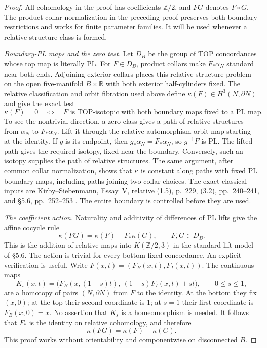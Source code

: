 \begin{proof}
All cohomology in the proof has coefficients $\mathbb Z/2$, and
$FG$ denotes $F\circ G$.  The product-collar normalization in the
preceding proof preserves both boundary restrictions and works for
finite parameter families.  It will be used whenever a relative
structure class is formed.

\emph{Boundary-PL maps and the zero test.}
Let $D_B$ be the group of TOP concordances whose top map is
literally PL.  For $F\in D_B$, product collars make $F_*\alpha_N$
standard near both ends.  Adjoining exterior collars places this
relative structure problem on the open five-manifold $B\times\mathbb R$
with both exterior half-cylinders fixed.  The relative classification
and orbit fibration used above define $\kappa(F)\in H^3(N,\partial N)$
and give the exact test
\begin{equation}\label{eq:relative-zero-test-boundary-pl}
 \kappa(F)=0
 \quad\Longleftrightarrow\quad
 F\text{ is TOP-isotopic with both boundary maps fixed to a PL map}.
\end{equation}
To see the nontrivial direction, a zero class gives a path of relative
structures from $\alpha_N$ to $F_*\alpha_N$.  Lift it through the
relative automorphism orbit map starting at the identity.  If $g$
is its endpoint, then $g_*\alpha_N=F_*\alpha_N$, so $g^{-1}F$ is
PL.  The lifted path gives the required isotopy, fixed near the
boundary.  Conversely, such an isotopy supplies the path of relative
structures.  The same argument, after common collar normalization,
shows that $\kappa$ is constant along paths with fixed PL boundary
maps, including paths joining two collar choices.  The exact
classical inputs are Kirby--Siebenmann, Essay~V, relative (1.5),
p.~229, (3.2), pp.~240--241, and \S5.6, pp.~252--253
\cite{KirbySiebenmann1977}.  The entire boundary is controlled before
they are used.

\emph{The coefficient action.}
Naturality and additivity of differences of PL lifts give the affine
cocycle rule
\[
 \kappa(FG)=\kappa(F)+F_*\kappa(G),\qquad F,G\in D_B.
\]
This is the addition of relative maps into $K(\mathbb Z/2,3)$ in
the standard-lift model of \S5.6.  The action is trivial for every
bottom-fixed concordance.  An explicit verification is useful.
Write $F(x,t)=(F_B(x,t),F_I(x,t))$.  The continuous maps
\[
 K_s(x,t)=\bigl(F_B(x,(1-s)t),\ (1-s)F_I(x,t)+st\bigr),
             \qquad 0\leq s\leq1,
\]
are a homotopy of pairs $(N,\partial N)$ from $F$ to the identity.
At the bottom they fix $(x,0)$; at the top their second coordinate
is $1$; at $s=1$ their first coordinate is $F_B(x,0)=x$.
No assertion that $K_s$ is a homeomorphism is needed.
It follows that $F_*$ is the identity on relative cohomology, and
therefore
\begin{equation}\label{eq:four-dimensional-kappa-additivity}
 \kappa(FG)=\kappa(F)+\kappa(G).
\end{equation}
This proof works without orientability and componentwise on
disconnected $B$.


\end{proof}
